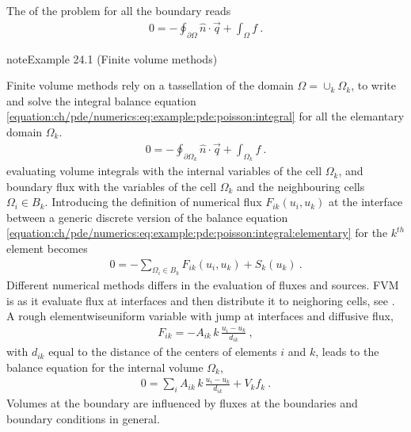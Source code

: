 \documentclass[letterpaper,10pt,english]{jupyterBook}
\begin{document}
\sphinxAtStartPar
The  of the problem for all the boundary reads
\begin{equation}\label{equation:ch/pde/numerics:eq:example:pde:poisson:integral}
\begin{split}0 = - \oint_{\partial \Omega} \hat{n} \cdot \vec{q} + \int_{\Omega} f \ .\end{split}
\end{equation}\label{ch/pde/numerics:pde:ex:fvm}
\begin{sphinxadmonition}{note}{Example 24.1 (Finite volume methods)}



\sphinxAtStartPar
Finite volume methods rely on a tassellation of the domain \(\Omega = \cup_k \Omega_k\), to write and solve the integral balance equation \eqref{equation:ch/pde/numerics:eq:example:pde:poisson:integral} for all the elemantary domain \(\Omega_k\).
\begin{equation}\label{equation:ch/pde/numerics:eq:example:pde:poisson:integral:elementary}
\begin{split}0 = - \oint_{\partial \Omega_k} \hat{n} \cdot \vec{q} + \int_{\Omega_k} f \ .\end{split}
\end{equation}
\sphinxAtStartPar
evaluating volume integrals with the internal variables of the cell \(\Omega_k\), and boundary flux with the variables of the cell \(\Omega_k\) and the neighbouring cells \(\Omega_i \in B_k\). Introducing the definition of numerical flux \(F_{ik}(u_i, u_k)\) at the interface between a generic discrete version of the balance equation  \eqref{equation:ch/pde/numerics:eq:example:pde:poisson:integral:elementary} for the \(k^{th}\) element becomes
\begin{equation*}
\begin{split}0 = - \sum_{\Omega_i \in B_k} F_{ik}(u_i, u_k) + S_k(u_k) \ .\end{split}
\end{equation*}
\sphinxAtStartPar
Different numerical methods differs in the evaluation of fluxes and sources.
FVM is  as it evaluate flux at interfaces and then distribute it to neighoring cells, see {\hyperref[\detokenize{ch/pde/fvm:fvm:property:conservation}]{}}. A rough elementwise\sphinxhyphen{}uniform variable with jump at interfaces and diffusive flux,
\begin{equation*}
\begin{split}F_{ik} = - A_{ik} \, k \, \frac{u_i - u_k}{d_{ik}} \ ,\end{split}
\end{equation*}
\sphinxAtStartPar
with \(d_{ik}\) equal to the distance of the centers of elements \(i\) and \(k\), leads to the balance equation for the internal volume \(\Omega_k\),
\begin{equation*}
\begin{split} 0 = \sum_{i} A_{ik} \, k \, \frac{u_i-u_k}{d_{ik}} + V_k f_k \ .\end{split}
\end{equation*}
\sphinxAtStartPar
Volumes at the boundary are influenced by fluxes at the boundaries and boundary conditions in general.


\end{sphinxadmonition}
\end{document}
